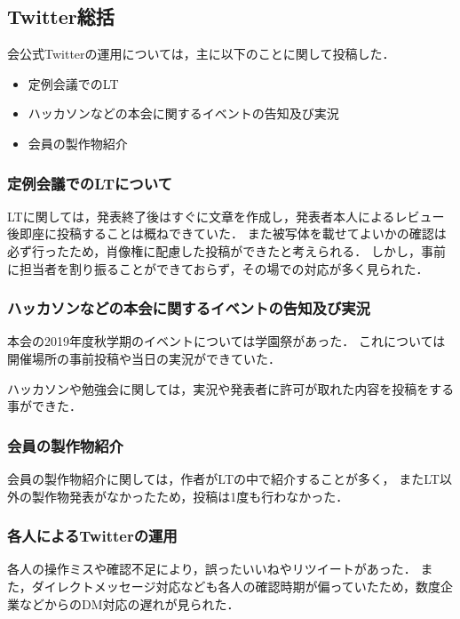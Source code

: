 \subsection*{Twitter総括}


会公式Twitterの運用については，主に以下のことに関して投稿した．
\begin{itemize}
\item 定例会議でのLT
\item ハッカソンなどの本会に関するイベントの告知及び実況
\item 会員の製作物紹介
\end{itemize}

\subsubsection*{定例会議でのLTについて}
LTに関しては，発表終了後はすぐに文章を作成し，発表者本人によるレビュー後即座に投稿することは概ねできていた．
また被写体を載せてよいかの確認は必ず行ったため，肖像権に配慮した投稿ができたと考えられる．
しかし，事前に担当者を割り振ることができておらず，その場での対応が多く見られた．

\subsubsection*{ハッカソンなどの本会に関するイベントの告知及び実況}
本会の2019年度秋学期のイベントについては学園祭があった．
これについては開催場所の事前投稿や当日の実況ができていた．

ハッカソンや勉強会に関しては，実況や発表者に許可が取れた内容を投稿をする事ができた．

\subsubsection*{会員の製作物紹介}
会員の製作物紹介に関しては，作者がLTの中で紹介することが多く，
またLT以外の製作物発表がなかったため，投稿は1度も行わなかった．

\subsubsection*{各人によるTwitterの運用}
各人の操作ミスや確認不足により，誤ったいいねやリツイートがあった．
また，ダイレクトメッセージ対応なども各人の確認時期が偏っていたため，数度企業などからのDM対応の遅れが見られた．
